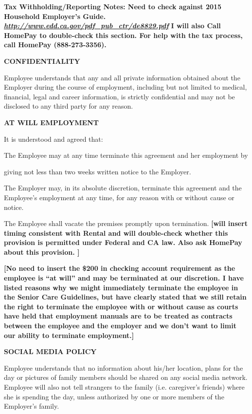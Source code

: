 \documentclass[]{article}
\begin{document}
\textbf{Tax Withholding/Reporting Notes: Need to check against 2015
Household Employer's Guide.}
\href{http://www.edd.ca.gov/pdf_pub_ctr/de8829.pdf}{\textbf{\emph{http://www.edd.ca.gov/pdf\_pub\_ctr/de8829.pdf}}}
\textbf{I will also Call HomePay to double-check this section. For help
with the tax process, call HomePay (888-273-3356). }

\textbf{CONFIDENTIALITY}

Employee understands that any and all private information obtained about
the Employer during the course of employment, including but not limited
to medical, financial, legal and career information, is strictly
confidential and may not be disclosed to any third party for any reason.

\textbf{AT WILL EMPLOYMENT}

It is understood and agreed that:

The Employee may at any time terminate this agreement and her employment
by

giving not less than two weeks written notice to the Employer.

The Employer may, in its absolute discretion, terminate this agreement
and the Employee's employment at any time, for any reason with or
without cause or notice.

The Employee shall vacate the premises promptly upon termination.
\textbf{{[}will insert timing consistent with Rental and will
double-check whether this provision is permitted under Federal and CA
law. Also ask HomePay about this provision. {]}}

\textbf{{[}No need to insert the \$200 in checking account requirement
as the employee is ``at will'' and may be terminated at our discretion.
I have listed reasons why we might immediately terminate the employee in
the Senior Care Guidelines, but have clearly stated that we still retain
the right to terminate the employee with or without cause as courts have
held that employment manuals are to be treated as contracts between the
employee and the employer and we don't want to limit our ability to
terminate employment.{]} }

\textbf{SOCIAL MEDIA POLICY}

Employee understands that no information about his/her location, plans
for the day or pictures of family members should be shared on any social
media network. Employee will also not tell strangers to the family (i.e.
caregiver's friends) where she is spending the day, unless authorized by
one or more members of the Employer's family.
\end{document}
